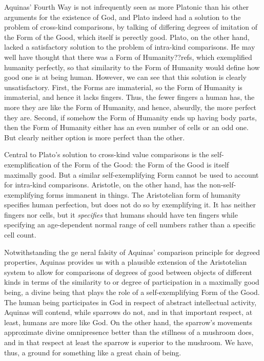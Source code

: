 Aquinas' Fourth Way is not infrequently seen as more Platonic than his other arguments for the existence of
God, and Plato indeed had a solution to the problem of cross-kind comparisons, by talking of differing degrees
of imitation of the Form of the Good, which itself is perectly good. Plato, on the other hand, lacked a 
satisfactory solution to the problem of intra-kind comparisons. He may well have thought that there 
was a Form of Humanity??refs, which exemplified humanity perfectly, so that similarity to the Form of 
Humanity would define how good one is at being human. However,
we can see that this solution is clearly unsatisfactory. First, the Forms are immaterial, so the Form of Humanity is 
immaterial, and hence it lacks fingers. Thus, the fewer fingers a human has, the more they are like the Form of
Humanity, and hence, absurdly, the more perfect they are. Second, if somehow the Form of Humanity ends up having 
body parts, then the Form of Humanity either has an even number of cells or an odd one. But clearly neither option
is more perfect than the other. 

Central to Plato's solution to cross-kind value comparisons is the self-exemplification of the Form of the Good:
the Form of the Good is itself maximally good. But a similar self-exemplifying Form cannot be used to account for
intra-kind comparisons. Aristotle, on the other hand, has the non-self-exemplifying forms immanent in things. 
The Aristotelian form of humanity specifies human perfection, but does not do so by exemplifying it. It has neither
fingers nor cells, but it \textit{specifies} that humans should have ten fingers while specifying an age-dependent
normal range of cell numbers rather than a specific cell count.

Notwithstanding the ge neral falsity of Aquinas' comparison principle for degreed properties, Aquinas provides us
with a plausible extension of the Aristotelian system to allow for comparisons of degrees of good between objects
of different kinds in terms of the similarity to or degree of participation in a maximally good being, a divine being
that plays the role of a self-exemplifying Form of the Good. The human being participates in God in respect of
abstract intellectual activity, Aquinas will contend, while sparrows do not, and in that important respect, at least,
humans are more like God. On the other hand, the sparrow's movements approximate divine omnipresence better than 
the stillness of a mushroom does, and in that respect at least the sparrow is superior to the mushroom. We have,
thus, a ground for something like a great chain of being.


